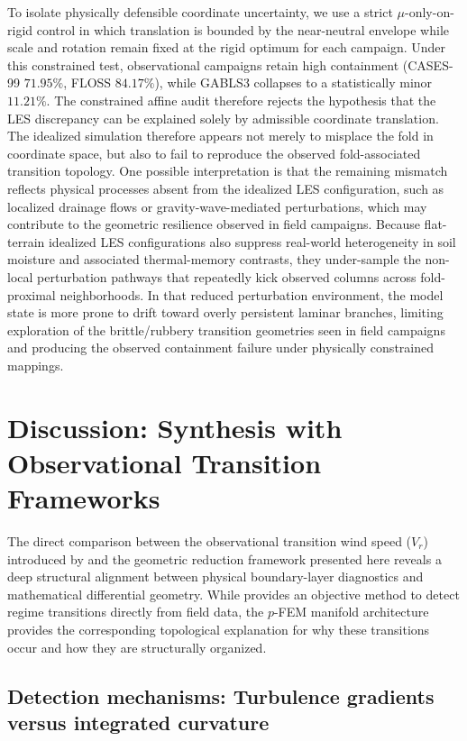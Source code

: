 \documentclass[12pt,a4paper]{article}
\begin{document}
To isolate physically defensible coordinate uncertainty, we use a strict $\mu$-only-on-rigid control in which translation is bounded by the near-neutral envelope while scale and rotation remain fixed at the rigid optimum for each campaign. Under this constrained test, observational campaigns retain high containment (CASES-99 $71.95\%$, FLOSS $84.17\%$), while GABLS3 collapses to a statistically minor $11.21\%$. The constrained affine audit therefore rejects the hypothesis that the LES discrepancy can be explained solely by admissible coordinate translation. The idealized simulation therefore appears not merely to misplace the fold in coordinate space, but also to fail to reproduce the observed fold-associated transition topology. One possible interpretation is that the remaining mismatch reflects physical processes absent from the idealized LES configuration, such as localized drainage flows or gravity-wave-mediated perturbations, which may contribute to the geometric resilience observed in field campaigns.
Because flat-terrain idealized LES configurations also suppress real-world heterogeneity in soil moisture and associated thermal-memory contrasts, they under-sample the non-local perturbation pathways that repeatedly kick observed columns across fold-proximal neighborhoods. In that reduced perturbation environment, the model state is more prone to drift toward overly persistent laminar branches, limiting exploration of the brittle/rubbery transition geometries seen in field campaigns and producing the observed containment failure under physically constrained mappings.

\section{Discussion: Synthesis with Observational Transition Frameworks}
\label{sec:synthesis_acevedo}

The direct comparison between the observational transition wind speed ($V_r$) introduced by \citet{acevedo2021external} and the geometric reduction framework presented here reveals a deep structural alignment between physical boundary-layer diagnostics and mathematical differential geometry. While \citet{acevedo2021external} provides an objective method to detect regime transitions directly from field data, the $p$-FEM manifold architecture provides the corresponding topological explanation for why these transitions occur and how they are structurally organized.

\subsection{Detection mechanisms: Turbulence gradients versus integrated curvature}
\end{document}

